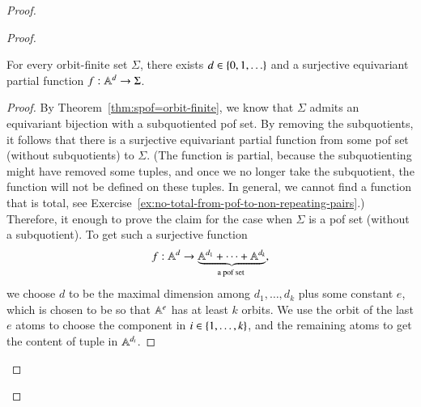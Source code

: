\begin{proof}
\begin{proof}
		\begin{claim}\label{claim:surjective-from-tuples}
			For every orbit-finite set $\Sigma$, there exists  $d \in \{0,1,\ldots\}$ and a surjective equivariant partial function $f : \mathbb A^d \to \Sigma$. 
		\end{claim}
		\begin{proof}
			By Theorem~\ref{thm:spof=orbit-finite}, we know that  $\Sigma$ admits an equivariant bijection with a subquotiented  pof set. By removing the subquotients, it follows that there is a surjective  equivariant partial function from some pof set (without subquotients) to $\Sigma$. (The function is partial, because the subquotienting might have removed some tuples, and once we no longer take the subquotient, the function will not be defined on these tuples. In general, we cannot find a function that is total, see Exercise~\ref{ex:no-total-from-pof-to-non-repeating-pairs}.) 
			Therefore, it enough to prove the claim for the case when $\Sigma$ is a  pof set (without a subquotient). To get such a surjective function 
			\begin{align*}
	f : \atoms^d \to			\myunderbrace{\atoms^{d_1} + \cdots + \atoms^{d_k}}{a pof set},
			\end{align*}
			we choose $d$ to be the maximal dimension among $d_1,\ldots,d_k$ plus some constant $e$, which is chosen to be so that $\mathbb A^e$ has at least $k$ orbits. We use the orbit of the last $e$ atoms to  choose the component in $i \in \{1,\ldots,k\}$, and the remaining atoms to get the content of tuple in $\mathbb A^{d_i}$. 
		\end{proof}


\end{proof}
\end{proof}

